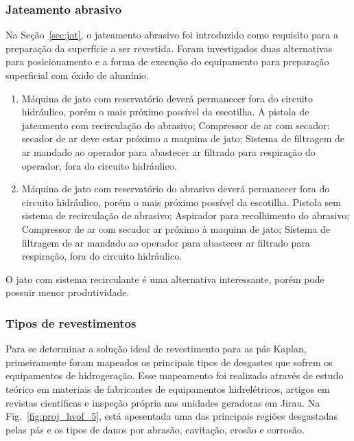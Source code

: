 \subsubsection{Jateamento abrasivo}

Na Seção~\ref{sec:jat}, o jateamento abrasivo foi introduzido como requisito
para a preparação da superfície a ser revestida. Foram investigados duas
alternativas para posicionamento e a forma de execução do equipamento
para preparação superficial com óxido de alumínio. 

\begin{enumerate}
  \item Máquina de jato com reservatório deverá permanecer fora do circuito
  hidráulico, porém o mais próximo possível da escotilha. A pistola de
  jateamento com recirculação do abrasivo; Compressor de ar com secador:
  secador de ar deve estar próximo a maquina de jato; Sistema de filtragem de
  ar mandado ao operador para abastecer ar filtrado para respiração
  do operador, fora do circuito hidráulico.
  \item Máquina de jato com reservatório do abrasivo deverá permanecer fora do
  circuito hidráulico, porém o mais próximo possível da escotilha. Pistola sem
  sistema de recirculação de abrasivo; Aspirador para recolhimento do abrasivo;
  Compressor de ar com secador ar próximo à maquina de jato; Sistema de
  filtragem de ar mandado ao operador para abastecer ar filtrado
  para respiração, fora do circuito hidráulico.
\end{enumerate}

O jato com sistema recirculante é uma alternativa interessante, porém pode
possuir menor produtividade.

\subsubsection{Tipos de revestimentos}

Para se determinar a solução ideal de revestimento para as pás Kaplan,
primeiramente foram mapeados os principais tipos de desgastes que sofrem os
equipamentos de hidrogeração. Esse mapeamento foi realizado através de estudo
teórico em materiais de fabricantes de equipamentos hidrelétricos, artigos em
revistas científicas e inspeção própria nas unidades geradoras em Jirau. Na
Fig.~\ref{fig:proj_hvof_5}, está apesentada uma das principais regiões
desgastadas pelas pás e os tipos de danos por abrasão, cavitação, erosão e corrosão.

